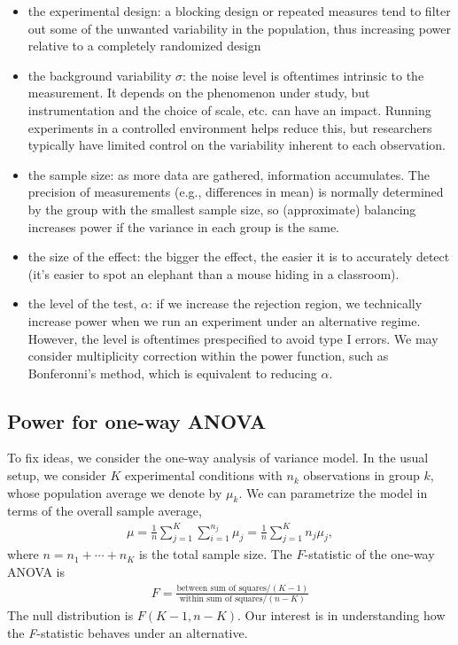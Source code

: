 \documentclass[
  11pt,
  letterpaper,
]{scrbook}
\providecommand{\tightlist}{%
  \setlength{\itemsep}{0pt}\setlength{\parskip}{0pt}}\usepackage{longtable,booktabs,array}
\theoremstyle{definition}
\theoremstyle{remark}
\begin{document}
\begin{itemize}
\tightlist
\item
  the experimental design: a blocking design or repeated measures tend
  to filter out some of the unwanted variability in the population, thus
  increasing power relative to a completely randomized design
\item
  the background variability \(\sigma\): the noise level is oftentimes
  intrinsic to the measurement. It depends on the phenomenon under
  study, but instrumentation and the choice of scale, etc. can have an
  impact. Running experiments in a controlled environment helps reduce
  this, but researchers typically have limited control on the
  variability inherent to each observation.
\item
  the sample size: as more data are gathered, information accumulates.
  The precision of measurements (e.g., differences in mean) is normally
  determined by the group with the smallest sample size, so
  (approximate) balancing increases power if the variance in each group
  is the same.
\item
  the size of the effect: the bigger the effect, the easier it is to
  accurately detect (it's easier to spot an elephant than a mouse hiding
  in a classroom).
\item
  the level of the test, \(\alpha\): if we increase the rejection
  region, we technically increase power when we run an experiment under
  an alternative regime. However, the level is oftentimes prespecified
  to avoid type I errors. We may consider multiplicity correction within
  the power function, such as Bonferonni's method, which is equivalent
  to reducing \(\alpha\).
\end{itemize}

\hypertarget{sec-power-oneway}{%
\subsection{Power for one-way ANOVA}\label{sec-power-oneway}}

To fix ideas, we consider the one-way analysis of variance model. In the
usual setup, we consider \(K\) experimental conditions with \(n_k\)
observations in group \(k\), whose population average we denote by
\(\mu_k\). We can parametrize the model in terms of the overall sample
average, \begin{align*}
\mu = \frac{1}{n}\sum_{j=1}^K\sum_{i=1}^{n_j} \mu_j = \frac{1}{n}\sum_{j=1}^K n_j \mu_j,
\end{align*} where \(n=n_1 + \cdots +n_K\) is the total sample size. The
\(F\)-statistic of the one-way ANOVA is \begin{align*}
F =  \frac{\text{between sum of squares}/(K-1)}{\text{within sum of squares}/(n-K)}
\end{align*} The null distribution is \(F(K-1, n-K)\). Our interest is
in understanding how the \emph{F}-statistic behaves under an
alternative.
\end{document}
